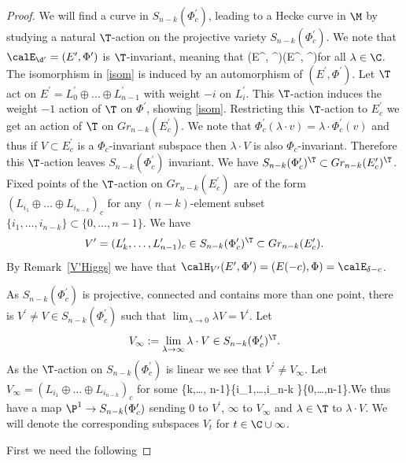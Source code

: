 \begin{proof}
	We will find a curve in $ S_{n-k}(\Phi^\prime_c)$, leading to a Hecke curve in $\M$ by studying a natural $\T$-action on the projective variety $S_{n-k}(\Phi^\prime_c)$. We note that $\calE_{\d^\prime}=(E^\prime, \Phi^\prime)$ is $\T$-invariant, meaning that \beq \label{isom}(E^\prime, \Phi^\prime)\cong (E^\prime, \lambda \Phi^\prime)\eeq for all $\lambda\in \C$. The isomorphism in \eqref{isom} is induced by an automorphism of $(E^\prime,\Phi^\prime)$. Let $\T$ act on $E^\prime=L^\prime_0\oplus \dots \oplus L^\prime_{n-1}$ with weight $-i$ on $L^\prime_i$. This $\T$-action induces the weight $-1$ action of $\T$ on $\Phi^\prime$, showing \eqref{isom}. Restricting this $\T$-action to $E^\prime_c$ we get an action of $\T$ on $Gr_{n-k}(E^\prime_c)$. We note that $\Phi^\prime_c(\lambda\cdot v)= \lambda\cdot \Phi^\prime_c(v)$ and thus if $V\subset E^\prime_c$ is a $\Phi_c$-invariant subspace then $\lambda\cdot V$ is also $\Phi_c$-invariant. Therefore this $\T$-action leaves $S_{n-k}(\Phi^\prime_c)$ invariant. We have $S_{n-k}(\Phi^\prime_c)^\T\subset Gr_{n-k}(E^\prime_c)^\T$.  Fixed points of the $\T$-action on $Gr_{n-k}(E^\prime_c)$ are of the form $(L_{i_1}\oplus \dots \oplus L_{i_{n-k}})_c$ for any $(n-k)$-element subset $\{i_1,\dots,i_{n-k} \}\subset \{0,\dots,n-1\}$. We  have $$V^\prime=(L^\prime_{k},\dots, L^\prime_{n-1})_c\in S_{n-k}(\Phi^\prime_c)^\T\subset Gr_{n-k}(E_c^\prime).$$ By Remark~\ref{V'Higgs} we have that $\calH_{V^\prime}(E^\prime,\Phi^\prime)=(E(-c),\Phi)=\calE_{\delta-c}$.

 As $S_{n-k}(\Phi^\prime_c)$ is projective, connected and contains more than one point, there is $V^\prime\neq V\in S_{n-k}(\Phi^\prime_c)$ such that $\lim_{\lambda\to 0} \lambda V=V^\prime$. Let $$V_\infty:=\lim_{\lambda\to \infty} \lambda\cdot V\in S_{n-k}(\Phi^\prime_c)^\T.$$ As the $\T$-action on $S_{n-k}(\Phi^\prime_c)$ is linear we see that  $V^\prime\neq V_\infty$. Let $V_\infty=(L_{i_1}\oplus \dots \oplus L_{i_{n-k}})_c$ for some \beq\label{subset}\{k,\dots, n-1\}\neq \{i_1,\dots,i_{n-k} \}\subset \{0,\dots,n-1\}.\eeq We thus have a map  $\P^1\to S_{n-k}(\Phi^\prime_c)$ sending $0$ to $V^\prime$, $\infty$ to $V_\infty$ and $\lambda \in \T$ to $\lambda\cdot V$. We will denote the corresponding subspaces $V_t$ for $t\in \C \cup {\infty}$.

	First we need the following


\end{proof}

